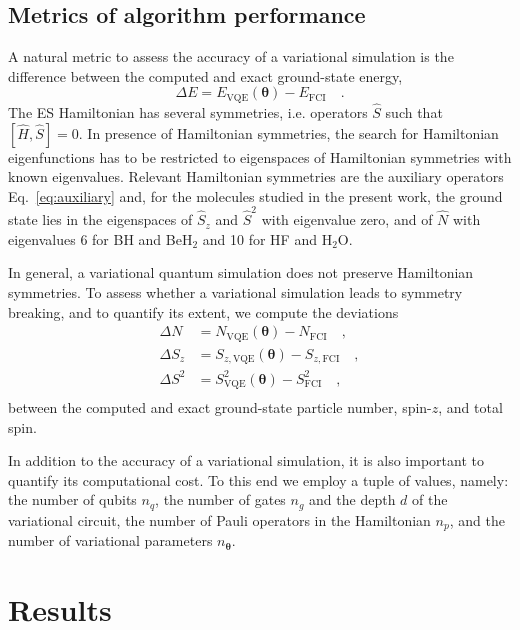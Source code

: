 \documentclass[aps,pra,twocolumn]{revtex4-2}
\newcommand{\bgreek}[1]{{\boldsymbol{#1}}}
\begin{document}
\subsection{Metrics of algorithm performance}
\label{sec:metrics}

A natural metric to assess the accuracy of a variational simulation is the difference between the computed and exact ground-state energy, 
\begin{equation}
\Delta E = E_{\mathrm{VQE}}(\bgreek{\theta}) - E_{\mathrm{FCI}}
\quad .
\end{equation}
The ES Hamiltonian has several symmetries, i.e. operators $\hat{S}$ such that $[\hat{H},\hat{S}]=0$. 
In presence of Hamiltonian symmetries, the search for Hamiltonian eigenfunctions has to be restricted to eigenspaces of Hamiltonian symmetries with known eigenvalues.
Relevant Hamiltonian symmetries are the auxiliary operators Eq.~\eqref{eq:auxiliary}
and, for the molecules studied in the present work, the ground state lies in the eigenspaces of $\hat{S}_z$ and $\hat{S}^2$ with eigenvalue zero,
and of $\hat{N}$ with eigenvalues $6$ for BH and BeH$_2$ and 10 for HF and H$_2$O.

In general, a variational quantum simulation does not preserve Hamiltonian symmetries. To assess whether a variational simulation
leads to symmetry breaking, and to quantify its extent, we compute the deviations
\begin{equation}
\begin{split}
\Delta N &= N_{\mathrm{VQE}}(\bgreek{\theta}) - N_{\mathrm{FCI}} \quad, \\
\Delta S_z &= S_{z,\mathrm{VQE}}(\bgreek{\theta}) - S_{z,\mathrm{FCI}} \quad, \\
\Delta S^2 &= S^2_{\mathrm{VQE}}(\bgreek{\theta}) - S^2_{\mathrm{FCI}} \quad, \\
\end{split}
\end{equation}
between the computed and exact ground-state particle number, spin-$z$, and total spin.

In addition to the accuracy of a variational simulation, it is also important to quantify its computational cost. To this end we employ a tuple of values,
namely: 
the number of qubits $n_q$,  
the number of gates $n_g$ and the depth $d$ of the variational circuit, 
the number of Pauli operators in the Hamiltonian $n_p$, 
and the number of variational parameters $n_{\bgreek{\theta}}$.

\section{Results}
\label{sec:results}
\end{document}
